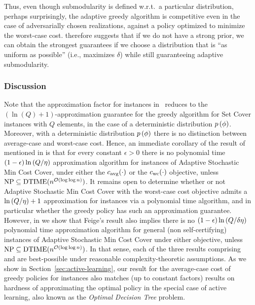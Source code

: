 Thus, even though \term submodularity is defined w.r.t.~a particular
distribution, perhaps surprisingly, the adaptive greedy algorithm is
competitive even in the case of  adversarially chosen realizations,
against a policy optimized to minimize the worst-case
cost.  therefore suggests
that if we do not have a strong prior, we can obtain the strongest
guarantees if we choose a distribution that is ``as uniform as
possible'' (i.e., maximizes $\delta$) while still guaranteeing
adaptive submodularity. 

\subsubsection{Discussion} Note that the approximation factor for \certifying instances 
in~
reduces to the $(\ln(Q)+1)$-approximation
guarantee for the greedy algorithm for Set Cover instances with $Q$
elements, in the case of a deterministic distribution ${\color{black}{\ensuremath{p \left( {{\color{black}{\ensuremath{\phi}}}} \right) }}}$.  
Moreover,  with a deterministic distribution ${\color{black}{\ensuremath{p \left( {{\color{black}{\ensuremath{\phi}}}} \right) }}}$
there is no distinction between average-case and
worst-case cost.
Hence, an immediate corollary of the result of
\citet{feige98threshold} mentioned in 
is that for every constant $\epsilon > 0$
there is
no polynomial time
$(1-\epsilon)\ln  \left( {Q/\eta} \right) $ approximation algorithm for
\certifying instances of 
Adaptive Stochastic Min Cost Cover, under either the ${c_{\text{avg}}{(\cdot)}}$ or 
the ${c_{\text{wc}}{(\cdot)}}$ objective, 
unless $\textrm{NP}\subseteq
\text{DTIME}(n^{{\mathcal{O}}(\log\log n)})$.
It remains open to determine whether or not 
Adaptive Stochastic Min Cost Cover with the worst-case cost objective 
admits a $\ln  \left( {Q/\eta} \right) +1$ approximation for \certifying instances
via a polynomial time algorithm, 
and in particular whether the greedy policy has such an approximation guarantee.
However, in  we show that Feige's result also implies
there is no $(1-\epsilon)\ln  \left( {Q/\delta\eta} \right) $ polynomial time approximation
algorithm for general (non self-certifying) instances of 
Adaptive Stochastic Min Cost Cover under either objective, unless $\textrm{NP}\subseteq
\text{DTIME}(n^{{\mathcal{O}}(\log\log n)})$.  In that sense, each of the three results
comprising  and
 are best-possible under reasonable complexity-theoretic assumptions.  
%
As we show in Section~\ref{sec:active-learning}, our result for the
average-case cost of greedy policies for \certifying instances 
 also matches (up to constant factors) results on hardness of approximating
the optimal policy in the special case of active learning, also known
as the \emph{Optimal Decision Tree} problem.


